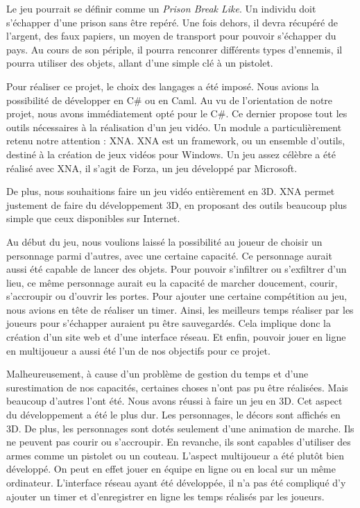 \documentclass[12pt]{article}
\begin{document}
Le jeu pourrait se définir comme un \textit{Prison Break Like}. Un individu doit s'échapper d'une prison sans être repéré. Une fois dehors, il devra récupéré de l'argent, des faux papiers, un moyen de transport pour pouvoir s'échapper du pays. Au cours de son périple, il pourra renconrer différents types d'ennemis, il pourra utiliser des objets, allant d'une simple clé à un pistolet.

Pour réaliser ce projet, le choix des langages a été imposé. Nous avions la possibilité de développer en C\# ou en Caml. Au vu de l'orientation de notre projet, nous avons immédiatement opté pour le C\#. Ce dernier propose tout les outils nécessaires à la réalisation d'un jeu vidéo. Un module a particulièrement retenu notre attention : XNA. XNA est un framework, ou un ensemble d'outils, destiné à la création de jeux vidéos pour Windows. Un jeu assez célèbre a été réalisé avec XNA, il s'agit de Forza, un jeu développé par Microsoft. 

De plus, nous souhaitions faire un jeu vidéo entièrement en 3D. XNA permet justement de faire du développement 3D, en proposant des outils beaucoup plus simple que ceux disponibles sur Internet.

Au début du jeu, nous voulions laissé la possibilité au joueur de choisir un personnage parmi d'autres, avec une certaine capacité. Ce personnage aurait aussi été capable de lancer des objets. Pour pouvoir s'infiltrer ou s'exfiltrer d'un lieu, ce même personnage aurait eu la capacité de marcher doucement, courir, s'accroupir ou d'ouvrir les portes. Pour ajouter une certaine compétition au jeu, nous avions en tête de réaliser un timer. Ainsi, les meilleurs temps réaliser par les joueurs pour s'échapper auraient pu être sauvegardés. Cela implique donc la création d'un site web et d'une interface réseau. Et enfin, pouvoir jouer en ligne en multijoueur a aussi été l'un de nos objectifs pour ce projet.

Malheureusement, à cause d'un problème de gestion du temps et d'une surestimation de nos capacités, certaines choses n'ont pas pu être réalisées. Mais beaucoup d'autres l'ont été. Nous avons réussi à faire un jeu en 3D. Cet aspect du développement a été le plus dur. Les personnages, le décors sont affichés en 3D. De plus, les personnages sont dotés seulement d'une animation de marche. Ils ne peuvent pas courir ou s'accroupir. En revanche, ils sont capables d'utiliser des armes comme un pistolet ou un couteau. L'aspect multijoueur a été plutôt bien développé. On peut en effet jouer en équipe en ligne ou en local sur un même ordinateur. L'interface réseau ayant été développée, il n'a pas été compliqué d'y ajouter un timer et d'enregistrer en ligne les temps réalisés par les joueurs. \\
\end{document}
